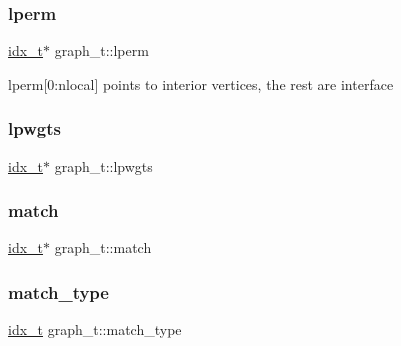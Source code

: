 \mbox{\label{a00734_aeee46ef4c29b1a5ffe208781e48a3dd8}} 
\subsubsection{\texorpdfstring{lperm}{lperm}}
{\footnotesize\ttfamily \hyperlink{a00876_aaa5262be3e700770163401acb0150f52}{idx\+\_\+t}$\ast$ graph\+\_\+t\+::lperm}

lperm\mbox{[}0\+:nlocal\mbox{]} points to interior vertices, the rest are interface \mbox{\label{a00734_a6e7e31d965f5b9529bc38967c330dc51}} 
\subsubsection{\texorpdfstring{lpwgts}{lpwgts}}
{\footnotesize\ttfamily \hyperlink{a00876_aaa5262be3e700770163401acb0150f52}{idx\+\_\+t}$\ast$ graph\+\_\+t\+::lpwgts}

\mbox{\label{a00734_a55c1372ca8b5f8eed9abf993313de1ff}} 
\subsubsection{\texorpdfstring{match}{match}}
{\footnotesize\ttfamily \hyperlink{a00876_aaa5262be3e700770163401acb0150f52}{idx\+\_\+t}$\ast$ graph\+\_\+t\+::match}

\mbox{\label{a00734_a674a01b43ab31ef9196cf4f24ac75452}} 
\subsubsection{\texorpdfstring{match\+\_\+type}{match\_type}}
{\footnotesize\ttfamily \hyperlink{a00876_aaa5262be3e700770163401acb0150f52}{idx\+\_\+t} graph\+\_\+t\+::match\+\_\+type}

\mbox{\label{a00734_a71e53c3699a6347393d864eaa52e4f66}} 
